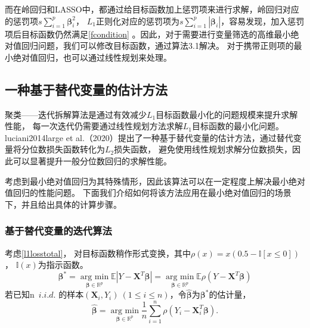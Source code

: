 而在岭回归和LASSO中，都通过给目标函数加上惩罚项来进行求解，岭回归对应的惩罚项$s\sum_{i=1}^p\bm{\beta}_i^2$，
$L_1$正则化对应的惩罚项为$s\sum_{i=1}^p|\bm{\beta}_i|$，容易发现，加入惩罚项后目标函数仍然满足\eqref{fcondition}
。因此，对于需要进行变量筛选的高维最小绝对值回归问题，我们可以修改目标函数，通过算法3.1解决。
对于携带正则项的最小绝对值回归，也可以通过线性规划来处理\cite{wang2006regularized}。

\subsection{一种基于替代变量的估计方法}
聚类——迭代拆解算法是通过有效减少$L_1$目标函数最小化的问题规模来提升求解性能，
每一次迭代仍需要通过线性规划方法求解$L_1$目标函数的最小化问题。
luciani2014large et al.（2020）提出了一种基于替代变量的估计方法\cite{svn}，通过替代变量将分位数损失函数转化为$L_2$损失函数，
避免使用线性规划求解分位数损失，因此可以显著提升一般分位数回归的求解性能。

考虑到最小绝对值回归为其特殊情形，因此该算法可以在一定程度上解决最小绝对值回归的性能问题。
下面我们介绍如何将该方法应用在最小绝对值回归的场景下，并且给出具体的计算步骤。

\subsubsection{基于替代变量的迭代算法}
考虑\eqref{l1losstotal}，
对目标函数稍作形式变换，其中$\rho(x) = x(0.5 - \mathbb{I}[x \leq 0])$，
$\mathbb{I}(x)$为指示函数。
\begin{equation}
\bm{\beta}^* = \underset{\bm{\beta} \in \mathbb{R}^{p}}{\operatorname{arg\ min}}\mathbb{E}|Y - \bm{X}^T\bm{\beta}| = 
\underset{\bm{\beta} \in \mathbb{R}^{p}}{\operatorname{arg\ min}}\mathbb{E}\rho(Y - \bm{X}^T\bm{\beta})
\end{equation}
若已知n\ $i.i.d.$ 的样本$(\bm{X}_i, Y_i)\ (1 \leq i \leq n)$，令$\hat{\bm{\beta}}$为$\bm{\beta}^*$的估计量，
\begin{equation}\label{rho-problem}
    \hat{\bm{\beta}} = \underset{\bm{\beta} \in \mathbb{R}^{p}}{\operatorname{arg\ min}}\frac1{n}\sum_{i=1}^{n}\rho(Y_i - \bm{X}_i^T\bm{\beta}).
\end{equation}

